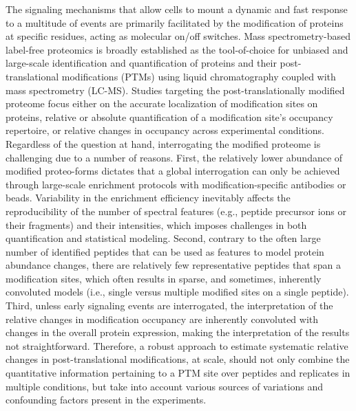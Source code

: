\documentclass[mcp]{article}
\numberwithin{figure}{section} %
\numberwithin{table}{section}
\begin{document}
The signaling mechanisms that allow cells to mount a dynamic and fast response to a multitude of events are primarily facilitated by the modification of proteins at specific residues, acting as molecular on/off switches.\cite{Deribe} \cite{Cohen}  Mass spectrometry-based label-free proteomics is broadly established as the tool-of-choice for unbiased and large-scale identification and quantification of proteins and their post-translational modifications (PTMs) using liquid chromatography coupled with mass spectrometry (LC-MS).\cite{Kall:2011ub} \cite{Roepstorff} Studies targeting the post-translationally modified proteome focus either on the accurate localization of modification sites on proteins, relative or absolute quantification of a modification site’s occupancy repertoire, or relative changes in occupancy across experimental conditions.\cite{Mann} Regardless of the question at hand, interrogating the modified proteome is challenging due to a number of reasons. First, the relatively lower abundance of modified proteo-forms dictates that a global interrogation can only be achieved through large-scale enrichment protocols with modification-specific antibodies or beads. Variability in the enrichment efficiency inevitably affects the reproducibility of the number of spectral features (e.g., peptide precursor ions or their fragments) and their intensities, which imposes challenges in both quantification and statistical modeling. Second, contrary to the often large number of identified peptides that can be used as features to model protein abundance changes, there are relatively few representative peptides that span a modification sites, which often results in sparse, and sometimes, inherently convoluted models (i.e., single versus multiple modified sites on a single peptide). Third, unless early signaling events are interrogated, the interpretation of the relative changes in modification occupancy are inherently convoluted with changes in the overall protein expression, making the interpretation of the results not straightforward. \cite{Olsen:2013} Therefore, a robust approach to estimate systematic relative changes in post-translational modifications, at scale, should not only combine the quantitative information pertaining to a PTM site over peptides and replicates in multiple conditions, but take into account various sources of variations and confounding factors present in the experiments.
\end{document}
